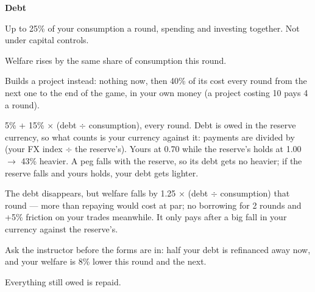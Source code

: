 \documentclass[11pt]{article}
\begin{document}
{\bfseries Debt}\par
{\footnotesize
\begin{description}[nosep,style=sameline,leftmargin=5.6em,font=\normalfont\bfseries]
  \item[Borrow] Up to 25\% of your consumption a round, spending and investing together. Not under capital controls.
  \item[Spend] Welfare rises by the same share of consumption this round.
  \item[Invest] Builds a project instead: nothing now, then 40\% of its cost every round from the next one to the end of the game, in your own money (a project costing 10 pays 4 a round).
  \item[Interest] 5\% + 15\% $\times$ (debt $\div$ consumption), every round. Debt is owed in the reserve currency, so what counts is your currency against it: payments are divided by (your FX index $\div$ the reserve's). Yours at 0.70 while the reserve's holds at 1.00 $\to$ 43\% heavier. A peg falls with the reserve, so its debt gets no heavier; if the reserve falls and yours holds, your debt gets lighter.
  \item[Default] The debt disappears, but welfare falls by 1.25 $\times$ (debt $\div$ consumption) that round --- more than repaying would cost at par; no borrowing for 2 rounds and +5\% friction on your trades meanwhile. It only pays after a big fall in your currency against the reserve's.
  \item[IMF] Ask the instructor before the forms are in: half your debt is refinanced away now, and your welfare is 8\% lower this round and the next.
  \item[Last round] Everything still owed is repaid.
\end{description}}
\end{document}
